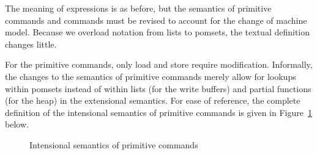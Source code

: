 \documentclass[11pt]{article}
\begin{document}
The meaning of expressions is as before, but the semantics of primitive commands and commands must be revised to account for the change of machine model. Because we overload notation from lists to pomsets, the textual definition changes little. 

For the primitive commands, only load and store require modification. Informally, the changes to the semantics of primitive commands merely allow for lookups within pomsets instead of within lists (for the write buffers) and partial functions (for the heap) in the extensional semantics. For ease of reference, the complete definition of the intensional semantics of primitive commands is given in Figure~\ref{fig:int-primitive-semantics} below.

\begin{figure}[ht]
	\centering
	\caption{\label{fig:int-primitive-semantics} Intensional semantics of primitive commands}
\end{figure}
\end{document}
